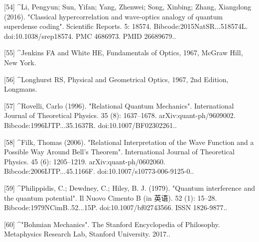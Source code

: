 [54]
^Li, Pengyun; Sun, Yifan; Yang, Zhenwei; Song, Xinbing; Zhang, Xiangdong (2016). "Classical hypercorrelation and wave-optics analogy of quantum superdense coding". Scientific Reports. 5: 18574. Bibcode:2015NatSR...518574L. doi:10.1038/srep18574. PMC 4686973. PMID 26689679..

[55]
^Jenkins FA and White HE, Fundamentals of Optics, 1967, McGraw Hill, New York.


[56]
^Longhurst RS, Physical and Geometrical Optics, 1967, 2nd Edition, Longmans.

[57]
^Rovelli, Carlo (1996). "Relational Quantum Mechanics". International Journal of Theoretical Physics. 35 (8): 1637–1678. arXiv:quant-ph/9609002. Bibcode:1996IJTP...35.1637R. doi:10.1007/BF02302261..

[58]
^Filk, Thomas (2006). "Relational Interpretation of the Wave Function and a Possible Way Around Bell's Theorem". International Journal of Theoretical Physics. 45 (6): 1205–1219. arXiv:quant-ph/0602060. Bibcode:2006IJTP...45.1166F. doi:10.1007/s10773-006-9125-0..

[59]
^Philippidis, C.; Dewdney, C.; Hiley, B. J. (1979). "Quantum interference and the quantum potential". Il Nuovo Cimento B (in 英语). 52 (1): 15–28. Bibcode:1979NCimB..52...15P. doi:10.1007/bf02743566. ISSN 1826-9877..

[60]
^"Bohmian Mechanics". The Stanford Encyclopedia of Philosophy. Metaphysics Research Lab, Stanford University. 2017..